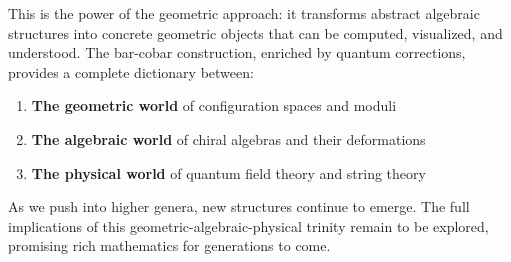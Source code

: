 This is the power of the geometric approach: it transforms abstract algebraic structures into concrete geometric objects that can be computed, visualized, and understood. The bar-cobar construction, enriched by quantum corrections, provides a complete dictionary between:

\begin{enumerate}
\item \textbf{The geometric world} of configuration spaces and moduli
\item \textbf{The algebraic world} of chiral algebras and their deformations  
\item \textbf{The physical world} of quantum field theory and string theory
\end{enumerate}

As we push into higher genera, new structures continue to emerge. The full implications of this geometric-algebraic-physical trinity remain to be explored, promising rich mathematics for generations to come.

